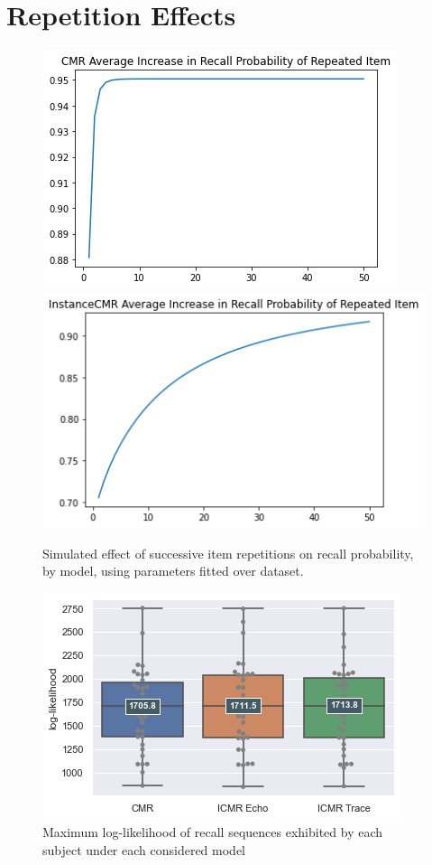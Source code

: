 \documentclass{article}
\begin{document}
\section{Repetition Effects}

\begin{figure}[h]
  \centering
  \includegraphics[width=.4\textwidth]{cmr_repeffect.png} \includegraphics[width=.4\textwidth]{icmr_repeffect.png}
  \caption{Simulated effect of successive item repetitions on recall probability, by model, using parameters fitted over \citet{murdock1970interresponse} dataset.}
  \label{fig:repeffect}
\end{figure}


\begin{figure}[h]
  \centering
  \includegraphics[width=.5\textwidth]{Lohnas_fit_all.png}
  \caption{Maximum log-likelihood of recall sequences exhibited by each subject under each considered model \citep{siegel2014retrieved}}
  \label{fig:LohnasFits}
\end{figure}
\end{document}
